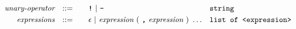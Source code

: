 \begin{alignat*}{9}
&& \textit{unary-operator}    
                        && ::= &\quad && \textbf{\texttt{!}}\ |\ \textbf{\texttt{-}}
                        && \texttt{string} \\
&& \textit{expressions}  && ::= &\quad && \epsilon\ | \ \textit{expression}\ (
                                                               \ \textbf{\texttt{,}} \
                                                                 \textit{expression} \ 
                                                                      )\ \ldots
                                                            && \texttt{list of <expression>} \\
\end{alignat*}



\newpage
{}
\recalctypearea

